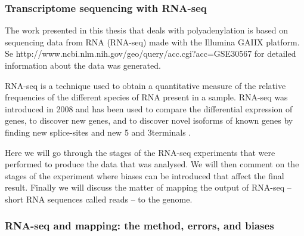 %
\subsubsection{Transcriptome sequencing with RNA-seq}
The work presented in this thesis that deals with polyadenylation is based on
sequencing data from RNA (RNA-seq) made with the Illumina GAIIX platform. Se
http://www.ncbi.nlm.nih.gov/geo/query/acc.cgi?acc=GSE30567 for detailed
information about the data was generated.

RNA-seq is a technique used to obtain a quantitative measure of the relative
frequencies of the different species of RNA present in a sample. RNA-seq was
introduced in 2008 \cite{nagalakshmi_transcriptional_2008} and has been used
to compare the differential expression of genes, to discover new genes, and to
discover novel isoforms of known genes by finding new splice-sites and new 5\p
and 3\p terminals \cite{wang_rna-seq:_2009}.

Here we will go through the stages of the RNA-seq experiments that were
performed to produce the data that was analysed. We will then comment on the
stages of the experiment where biases can be introduced that affect the final
result. Finally we will discuss the matter of mapping the output of RNA-seq --
short RNA sequences called reads -- to the genome.

\subsubsection{RNA-seq and mapping: the method, errors, and biases}

